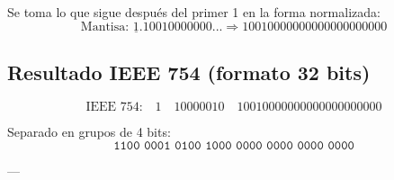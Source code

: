 \documentclass[a4paper,12pt]{article}
\begin{document}
\begin{center}
			Se toma lo que sigue después del primer 1 en la forma normalizada:
			\vspace{-0.5em}
			\[
			\text{Mantisa: } \underline{1}.10010000000... \Rightarrow 10010000000000000000000
			\]
			
			\subsection*{Resultado IEEE 754 (formato 32 bits)}
			
			\[
			\text{IEEE 754:} \quad 
			\boxed{1} \quad \boxed{10000010} \quad \boxed{10010000000000000000000}
			\]

			Separado en grupos de 4 bits:
			\vspace{-0.5em}
			\[
			\texttt{1100\ 0001\ 0100\ 1000\ 0000\ 0000\ 0000\ 0000}
			\]
			
			---	
		\end{center}
\end{document}
